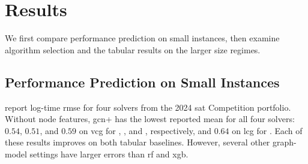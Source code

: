 \section{Results}
\label{sec:ch07:results}
We first compare performance prediction on small instances, then examine algorithm selection and the tabular results on the larger size regimes.

\subsection{Performance Prediction on Small Instances}
\label{sec:ch07:prediction-results}
 report log-time \gls{rmse} for four solvers from the 2024 \gls{sat} Competition portfolio. Without node features, \gls{gcn}+ has the lowest reported mean for all four solvers: $0.54$, $0.51$, and $0.59$ on \gls{vcg} for , , and , respectively, and $0.64$ on \gls{lcg} for . Each of these results improves on both tabular baselines. However, several other graph-model settings have larger errors than \gls{rf} and \gls{xgb}.

